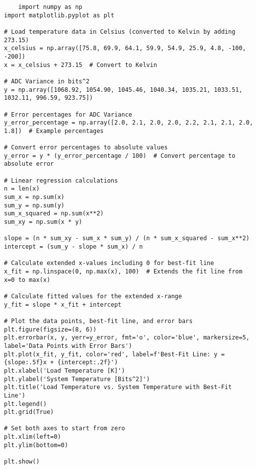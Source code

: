 \documentclass[10pt, preprint]{aastex}
\begin{document}
\begin{verbatim}
    import numpy as np
import matplotlib.pyplot as plt

# Load temperature data in Celsius (converted to Kelvin by adding 273.15)
x_celsius = np.array([75.8, 69.9, 64.1, 59.9, 54.9, 25.9, 4.8, -100, -200])
x = x_celsius + 273.15  # Convert to Kelvin

# ADC Variance in bits^2
y = np.array([1068.92, 1054.90, 1045.46, 1040.34, 1035.21, 1033.51, 1032.11, 996.59, 923.75])

# Error percentages for ADC Variance
y_error_percentage = np.array([2.0, 2.1, 2.0, 2.0, 2.2, 2.1, 2.1, 2.0, 1.8])  # Example percentages

# Convert error percentages to absolute values
y_error = y * (y_error_percentage / 100)  # Convert percentage to absolute error

# Linear regression calculations
n = len(x)
sum_x = np.sum(x)
sum_y = np.sum(y)
sum_x_squared = np.sum(x**2)
sum_xy = np.sum(x * y)

slope = (n * sum_xy - sum_x * sum_y) / (n * sum_x_squared - sum_x**2)
intercept = (sum_y - slope * sum_x) / n

# Calculate extended x-values including 0 for best-fit line
x_fit = np.linspace(0, np.max(x), 100)  # Extends the fit line from x=0 to max(x)

# Calculate fitted values for the extended x-range
y_fit = slope * x_fit + intercept

# Plot the data points, best-fit line, and error bars
plt.figure(figsize=(8, 6))
plt.errorbar(x, y, yerr=y_error, fmt='o', color='blue', markersize=5, label='Data Points with Error Bars')
plt.plot(x_fit, y_fit, color='red', label=f'Best-Fit Line: y = {slope:.5f}x + {intercept:.2f}')
plt.xlabel('Load Temperature [K]')
plt.ylabel('System Temperature [Bits^2]')
plt.title('Load Temperature vs. System Temperature with Best-Fit Line')
plt.legend()
plt.grid(True)

# Set both axes to start from zero
plt.xlim(left=0)
plt.ylim(bottom=0)

plt.show()      
\end{verbatim}
\end{document}

